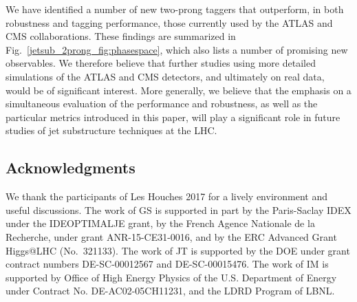 \documentclass[11pt]{cernrep}
\begin{document}
We have identified a  number of new two-prong taggers that outperform, in both robustness and tagging performance, those currently used by the ATLAS and CMS collaborations.
%
These findings are summarized in Fig.~\ref{jetsub_2prong_fig:phasespace}, which also lists a number of promising new observables.
%
We therefore believe that further studies using more detailed simulations of the ATLAS and CMS detectors, and ultimately on real data, would be of significant interest.
%
More generally, we believe that the emphasis on a simultaneous evaluation of the performance and robustness, as well as the particular metrics introduced in this paper, will play a significant role in future studies of jet substructure techniques at the LHC.

\subsection*{Acknowledgments}

We thank the participants of Les Houches 2017 for a lively environment and useful discussions. The work of GS is supported in part by the Paris-Saclay IDEX under the
IDEOPTIMALJE grant, by the French Agence Nationale de la Recherche,
under grant ANR-15-CE31-0016, and by the ERC Advanced Grant Higgs@LHC
(No.\ 321133).
%
The work of JT is supported by the DOE under grant contract numbers DE-SC-00012567 and DE-SC-00015476.
%
The work of IM is supported by Office of High Energy Physics of the U.S. Department of Energy under Contract No. DE-AC02-05CH11231, and the LDRD Program of LBNL.






\end{document}
